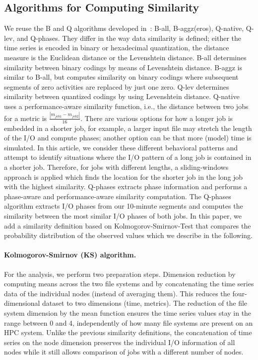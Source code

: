 \documentclass{jhps}
\begin{document}
\subsection{Algorithms for Computing Similarity}
We reuse the B and Q algorithms developed in~\cite{Eugen20HPS}: B-all, B-aggz(eros), Q-native, Q-lev, and Q-phases.
They differ in the way data similarity is defined; either the time series is encoded in binary or hexadecimal quantization, the distance measure is the Euclidean distance or the Levenshtein distance.
B-all determines similarity between binary codings by means of Levenshtein distance.
B-aggz is similar to B-all, but computes similarity on binary codings where subsequent segments of zero activities are replaced by just one zero.
Q-lev determines similarity between quantized codings by using Levenshtein distance.
Q-native uses a performance-aware similarity function, i.e., the distance between two jobs for a metric is $\frac{|m_{job1} - m_{job2}|}{16}$.
There are various options for how a longer job is embedded in a shorter job, for example, a larger input file may stretch the length of the I/O and compute phases; another option can be that more (model) time is simulated. In this article, we consider these different behavioral patterns and attempt to identify situations where the I/O pattern of a long job is contained in a shorter job. Therefore, for jobs with different lengths, a sliding-windows approach is applied which finds the location for the shorter job in the long job with the highest similarity.
Q-phases extracts phase information and performs a phase-aware and performance-aware similarity computation.
The Q-phases algorithm extracts I/O phases from our 10-minute segments and computes the similarity between the most similar I/O phases of both jobs.
In this paper, we add a similarity definition based on Kolmogorov-Smirnov-Test that compares the probability distribution of the observed values which we describe in the following.

\paragraph{Kolmogorov-Smirnov (KS) algorithm.}
For the analysis, we perform two preparation steps.
Dimension reduction by computing means across the two file systems and by concatenating the time series data of the individual nodes (instead of averaging them).
This reduces the four-dimensional dataset to two dimensions (time, metrics).
The reduction of the file system dimension by the mean function ensures the time series values stay in the range between 0 and 4, independently of how many file systems are present on an HPC system.
Unlike the previous similarity definitions, the concatenation of time series on the node dimension preserves the individual I/O information of all nodes while it still allows comparison of jobs with a different number of nodes.
\end{document}

